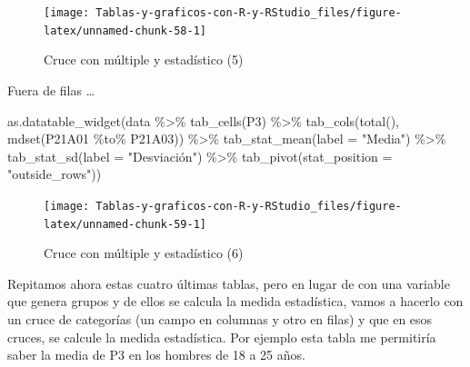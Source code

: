\documentclass[
]{book}
\newenvironment{Shaded}{\begin{snugshade}}{\end{snugshade}}
\newcommand{\AttributeTok}[1]{\textcolor[rgb]{0.77,0.63,0.00}{#1}}
\newcommand{\FunctionTok}[1]{\textcolor[rgb]{0.00,0.00,0.00}{#1}}
\newcommand{\NormalTok}[1]{#1}
\newcommand{\SpecialCharTok}[1]{\textcolor[rgb]{0.00,0.00,0.00}{#1}}
\newcommand{\StringTok}[1]{\textcolor[rgb]{0.31,0.60,0.02}{#1}}
\begin{document}
\begin{figure}[H]

{\centering \texttt{[image: Tablas-y-graficos-con-R-y-RStudio\_files/figure-latex/unnamed-chunk-58-1]} 

}

\caption{Cruce con múltiple y estadístico (5)}\label{fig:unnamed-chunk-58}
\end{figure}

Fuera de filas \ldots{}

\begin{Shaded}
\begin{Highlighting}[]
\FunctionTok{as.datatable\_widget}\NormalTok{(data }\SpecialCharTok{\%\textgreater{}\%}
  \FunctionTok{tab\_cells}\NormalTok{(P3) }\SpecialCharTok{\%\textgreater{}\%}
  \FunctionTok{tab\_cols}\NormalTok{(}\FunctionTok{total}\NormalTok{(), }\FunctionTok{mdset}\NormalTok{(P21A01 }\SpecialCharTok{\%to\%}\NormalTok{ P21A03)) }\SpecialCharTok{\%\textgreater{}\%}
  \FunctionTok{tab\_stat\_mean}\NormalTok{(}\AttributeTok{label =} \StringTok{"Media"}\NormalTok{) }\SpecialCharTok{\%\textgreater{}\%}
  \FunctionTok{tab\_stat\_sd}\NormalTok{(}\AttributeTok{label =} \StringTok{"Desviación"}\NormalTok{) }\SpecialCharTok{\%\textgreater{}\%}
  \FunctionTok{tab\_pivot}\NormalTok{(}\AttributeTok{stat\_position =} \StringTok{"outside\_rows"}\NormalTok{))}
\end{Highlighting}
\end{Shaded}

\begin{figure}[H]

{\centering \texttt{[image: Tablas-y-graficos-con-R-y-RStudio\_files/figure-latex/unnamed-chunk-59-1]} 

}

\caption{Cruce con múltiple y estadístico (6)}\label{fig:unnamed-chunk-59}
\end{figure}

Repitamos ahora estas cuatro últimas tablas, pero en lugar de con una variable que genera grupos y de ellos se calcula la medida estadística, vamos a hacerlo con un cruce de categorías (un campo en columnas y otro en filas) y que en esos cruces, se calcule la medida estadística. Por ejemplo esta tabla me permitiría saber la media de P3 en los hombres de 18 a 25 años.
\end{document}
